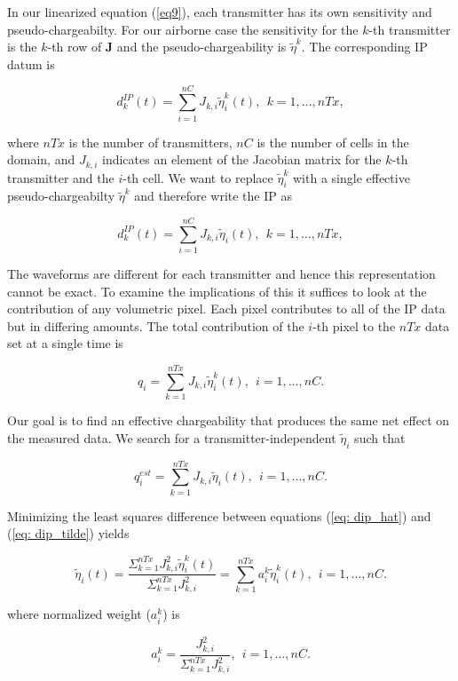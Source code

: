 \documentclass[extra,mreferee]{gji}
\newcommand{\peta}{\tilde{\eta}}
\newcommand{\dip}{d^{IP}}
\begin{document}
In our linearized equation (\ref{eq9}), each transmitter has its own sensitivity and pseudo-chargeabilty. For our airborne case the sensitivity for the $k$-th transmitter is the $k$-th row of $\mathbf{J}$ and the pseudo-chargeability is $\peta^k$. The corresponding  IP datum is 
\begin{linenomath*}
\begin{equation}
  \dip_k(t) = \sum_{i=1}^{nC}J_{k,i}\peta^k_i (t), \ \ k=1, \ldots, nTx,
  \label{eq: dip_kthTx}
\end{equation}
\end{linenomath*}
where $nTx$ is the number of transmitters, $nC$ is the number of cells in the domain, and $J_{k,i}$ indicates an element of the Jacobian matrix for the $k$-th transmitter and the $i$-th cell. We want to replace $\peta^k_i$ with a single effective pseudo-chargeabilty $\peta^k$ and therefore write the IP as 
\begin{linenomath*}
\begin{equation}
  \dip_k(t) = \sum_{i=1}^{nC}J_{k,i}\peta_i (t), \ \ k=1, \ldots, nTx,
  \label{eq: dipeff_kthTx}
\end{equation}
\end{linenomath*}
The waveforms are different for each transmitter and hence this representation cannot be exact. To examine the implications of this it suffices to look at the contribution of any volumetric pixel. Each pixel contributes to all of the IP data but in differing amounts. The total contribution of the  $i$-th pixel to the $nTx$ data set at a single time is  
\begin{linenomath*}
\begin{equation}
  q_i =\sum_{k=1}^{nTx} J_{k,i} \peta^k_i(t), \ \ i=1, \ldots, nC.
  \label{eq: dip_hat}
\end{equation}
\end{linenomath*}
Our goal is to find an effective chargeability that produces the same net effect on the measured data. We search for a transmitter-independent $\peta_i$ such that 
\begin{linenomath*}
\begin{equation}
  q_i^{est} =\sum_{k=1}^{nTx} J_{k,i} \peta_i(t), \ \ i=1, \ldots, nC.
  \label{eq: dip_tilde}
\end{equation}
\end{linenomath*}
Minimizing the least squares difference between equations (\ref{eq: dip_hat}) and (\ref{eq: dip_tilde}) yields
\begin{linenomath*}
\begin{equation}
  \peta_i(t) = \frac {\Sigma_{k=1}^{nTx} J_{k,i}^2\peta^k_i(t)} {\Sigma_{k=1}^{nTx} J_{k,i}^2} = \sum_{k=1}^{nTx} a^k_i \peta^k_i(t), \ \ i=1, \ldots, nC.
  \label{eq: petaeff}
\end{equation}
\end{linenomath*}
where normalized weight ($a^k_i$) is 
\begin{linenomath*}
\begin{equation}
  a^k_i = \frac {J^2_{k,i}} {\Sigma_{k=1}^{nTx} J^2_{k,i}}, \ \ i=1, \ldots, nC.
  \label{eq: normalized_weights}
\end{equation}
\end{linenomath*}
\end{document}
